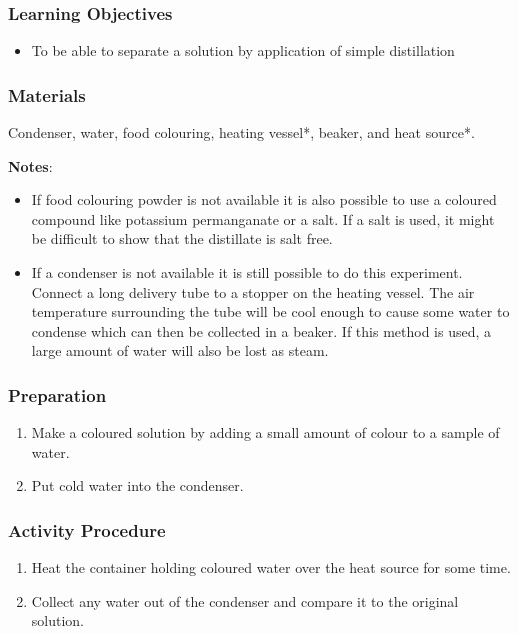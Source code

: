 \subsubsection*{Learning Objectives}
\begin{itemize}
\item{To be able to separate a solution by application of simple distillation}
\end{itemize}

\subsubsection*{Materials}
Condenser, water, food colouring, heating vessel*, beaker, and heat source*.

\textbf{Notes}:

\begin{itemize}
\item{If food colouring powder is not available it is also possible to use a coloured compound like potassium permanganate or a salt. If a salt is used, it might be difficult to show that the distillate is salt free.}
\item{If a condenser is not available it is still possible to do this experiment. Connect a long delivery tube to a stopper on the heating vessel. The air temperature surrounding the tube will be cool enough to cause some water to condense which can then be collected in a beaker. If this method is used, a large amount of water will also be lost as steam.}
\end{itemize}

\subsubsection*{Preparation}
\begin{enumerate}
\item{Make a coloured solution by adding a small amount of colour to a sample of water.}
\item{Put cold water into the condenser.}
\end{enumerate}

\subsubsection*{Activity Procedure}
\begin{enumerate}
\item{Heat the container holding coloured water over the heat source for some time.}
\item{Collect any water out of the condenser and compare it to the original solution.}
\end{enumerate}

